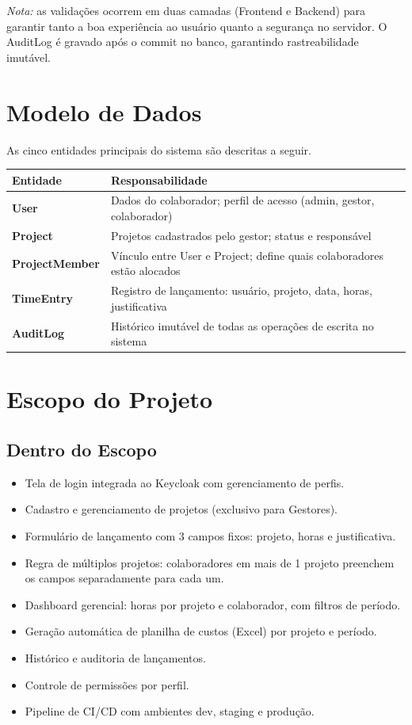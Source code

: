 \documentclass[12pt,a4paper]{article}
\begin{document}
\textit{Nota:} as validações ocorrem em duas camadas (Frontend e Backend) para garantir
tanto a boa experiência ao usuário quanto a segurança no servidor. O AuditLog é gravado
após o commit no banco, garantindo rastreabilidade imutável.

\section{Modelo de Dados}

As cinco entidades principais do sistema são descritas a seguir.

\begin{tabularx}{\linewidth}{>{\bfseries\ttfamily}lX}
  \toprule
  Entidade & Responsabilidade \\
  \midrule
  User          & Dados do colaborador; perfil de acesso (admin, gestor, colaborador) \\
  Project       & Projetos cadastrados pelo gestor; status e responsável \\
  ProjectMember & Vínculo entre User e Project; define quais colaboradores estão alocados \\
  TimeEntry     & Registro de lançamento: usuário, projeto, data, horas, justificativa \\
  AuditLog      & Histórico imutável de todas as operações de escrita no sistema \\
  \bottomrule
\end{tabularx}

\section{Escopo do Projeto}

\subsection{Dentro do Escopo}

\begin{itemize}[leftmargin=1.5em]
  \item Tela de login integrada ao Keycloak com gerenciamento de perfis.
  \item Cadastro e gerenciamento de projetos (exclusivo para Gestores).
  \item Formulário de lançamento com 3 campos fixos: projeto, horas e justificativa.
  \item Regra de múltiplos projetos: colaboradores em mais de 1 projeto preenchem os campos
    separadamente para cada um.
  \item Dashboard gerencial: horas por projeto e colaborador, com filtros de período.
  \item Geração automática de planilha de custos (Excel) por projeto e período.
  \item Histórico e auditoria de lançamentos.
  \item Controle de permissões por perfil.
  \item Pipeline de CI/CD com ambientes dev, staging e produção.
\end{itemize}
\end{document}

